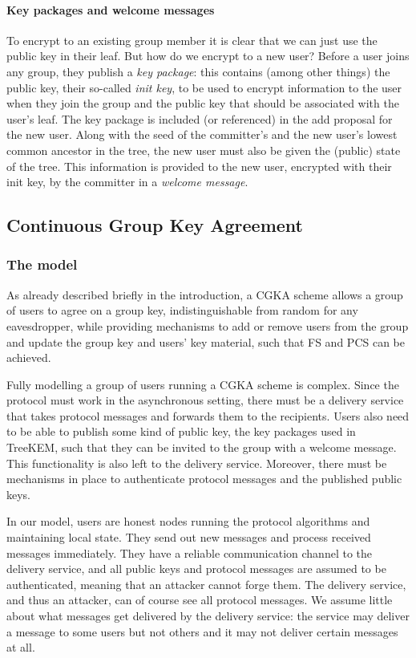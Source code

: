\paragraph{Key packages and welcome messages} To encrypt to an existing group member it is clear that we can just use the public key in their leaf. But how do we encrypt to a new user? Before a user joins any group, they publish a \emph{key package}: this contains (among other things) the public key, their so-called \emph{init key}, to be used to encrypt information to the user when they join the group and the public key that should be associated with the user's leaf. The key package is included (or referenced) in the add proposal for the new user. Along with the seed of the committer's and the new user's lowest common ancestor in the tree, the new user must also be given the (public) state of the tree. This information is provided to the new user, encrypted with their init key, by the committer in a \emph{welcome message}.

\subsection{Continuous Group Key Agreement} \label{sec:cgka}

\subsubsection{The model}

As already described briefly in the introduction, a CGKA scheme allows a group of users to agree on a group key, indistinguishable from random for any eavesdropper, while providing mechanisms to add or remove users from the group and update the group key and users' key material, such that FS and PCS can be achieved.

Fully modelling a group of users running a CGKA scheme is complex. Since the protocol must work in the asynchronous setting, there must be a delivery service that takes protocol messages and forwards them to the recipients. Users also need to be able to publish some kind of public key, the key packages used in TreeKEM, such that they can be invited to the group with a welcome message. This functionality is also left to the delivery service. Moreover, there must be mechanisms in place to authenticate protocol messages and the published public keys.

In our model, users are honest nodes running the protocol algorithms and maintaining local state. They send out new messages and process received messages immediately. They have a reliable communication channel to the delivery service, and all public keys and protocol messages are assumed to be authenticated, meaning that an attacker cannot forge them. The delivery service, and thus an attacker, can of course see all protocol messages. We assume little about what messages get delivered by the delivery service: the service may deliver a message to some users but not others and it may not deliver certain messages at all.

